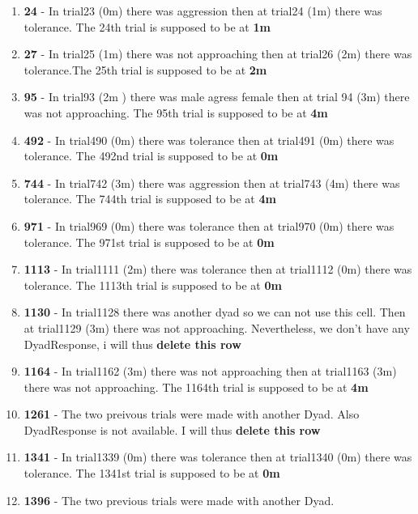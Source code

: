\documentclass[
]{article}
\providecommand{\tightlist}{%
  \setlength{\itemsep}{0pt}\setlength{\parskip}{0pt}}
\begin{document}
\begin{itemize}
  \begin{enumerate}
  \def\labelenumi{\arabic{enumi}.}
  \tightlist
  \item
    \textbf{24} - In trial23 (0m) there was aggression then at trial24
    (1m) there was tolerance. The 24th trial is supposed to be at
    \textbf{1m}
  \item
    \textbf{27} - In trial25 (1m) there was not approaching then at
    trial26 (2m) there was tolerance.The 25th trial is supposed to be at
    \textbf{2m}
  \item
    \textbf{95} - In trial93 (2m ) there was male agress female then at
    trial 94 (3m) there was not approaching. The 95th trial is supposed
    to be at \textbf{4m}
  \item
    \textbf{492} - In trial490 (0m) there was tolerance then at trial491
    (0m) there was tolerance. The 492nd trial is supposed to be at
    \textbf{0m}
  \item
    \textbf{744} - In trial742 (3m) there was aggression then at
    trial743 (4m) there was tolerance. The 744th trial is supposed to be
    at \textbf{4m}\\
  \item
    \textbf{971} - In trial969 (0m) there was tolerance then at trial970
    (0m) there was tolerance. The 971st trial is supposed to be at
    \textbf{0m}
  \item
    \textbf{1113} - In trial1111 (2m) there was tolerance then at
    trial1112 (0m) there was tolerance. The 1113th trial is supposed to
    be at \textbf{0m}
  \item
    \textbf{1130} - In trial1128 there was another dyad so we can not
    use this cell. Then at trial1129 (3m) there was not approaching.
    Nevertheless, we don't have any DyadResponse, i will thus
    \textbf{delete this row}
  \item
    \textbf{1164} - In trial1162 (3m) there was not approaching then at
    trial1163 (3m) there was not approaching. The 1164th trial is
    supposed to be at \textbf{4m}
  \item
    \textbf{1261} - The two preivous trials were made with another Dyad.
    Also DyadResponse is not available. I will thus \textbf{delete this
    row}
  \item
    \textbf{1341} - In trial1339 (0m) there was tolerance then at
    trial1340 (0m) there was tolerance. The 1341st trial is supposed to
    be at \textbf{0m}
  \item
    \textbf{1396} - The two previous trials were made with another Dyad.

\end{enumerate}
\end{itemize}
\end{document}
